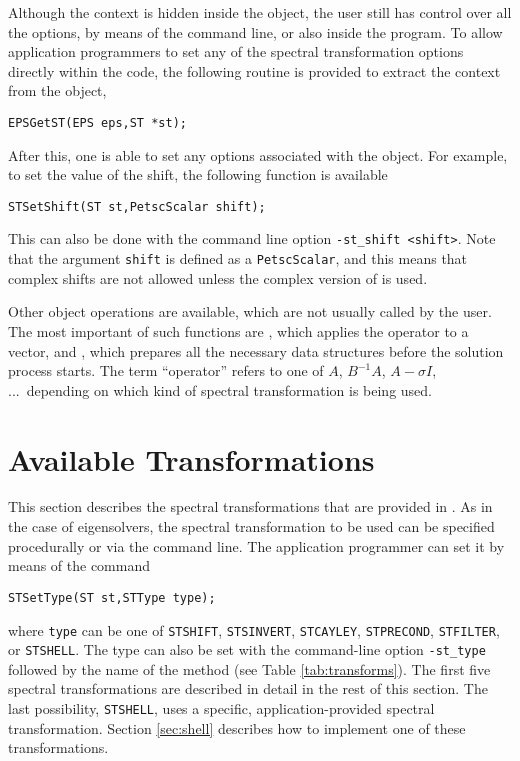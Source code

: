 	Although the  context is hidden inside the  object, the user still has control over all the options, by means of the command line, or also inside the program. To allow application programmers to set any of the spectral transformation options directly within the code, the following routine is provided to extract the  context from the  object,
	\begin{Verbatim}[fontsize=\small]
	EPSGetST(EPS eps,ST *st);
	\end{Verbatim}
	
	After this, one is able to set any options associated with the  object. For example, to set the value of the shift, the following function is available
	\begin{Verbatim}[fontsize=\small]
	STSetShift(ST st,PetscScalar shift);
	\end{Verbatim}
	This can also be done with the command line option \Verb!-st_shift <shift>!. Note that the argument \texttt{shift} is defined as a \texttt{PetscScalar}, and this means that complex shifts are not allowed unless the complex version of \slepc is used.

	Other object operations are available, which are not usually called by the user. The most important of such functions are , which applies the operator to a vector, and , which prepares all the necessary data structures before the solution process starts. The term ``operator'' refers to one of $A$, $B^{-1}\!A$, $A-\sigma I$, ...\ depending on which kind of spectral transformation is being used.

\section{Available Transformations}

	This section describes the spectral transformations that are provided in \slepc. As in the case of eigensolvers, the spectral transformation to be used can be specified procedurally or via the command line. The application programmer can set it by means of the command
	\begin{Verbatim}[fontsize=\small]
	STSetType(ST st,STType type);
	\end{Verbatim}
where \texttt{type} can be one of
\texttt{STSHIFT},
\texttt{STSINVERT}, \texttt{STCAYLEY},
\texttt{STPRECOND}, \texttt{STFILTER}, or \texttt{STSHELL}.
The  type can also be set with the command-line option \Verb!-st_type! followed by the name of the method (see Table \ref{tab:transforms}). The first five spectral transformations are described in detail in the rest of this section. The last possibility, \texttt{STSHELL}, uses a specific, application-provided spectral transformation. Section \ref{sec:shell} describes how to implement one of these transformations.

